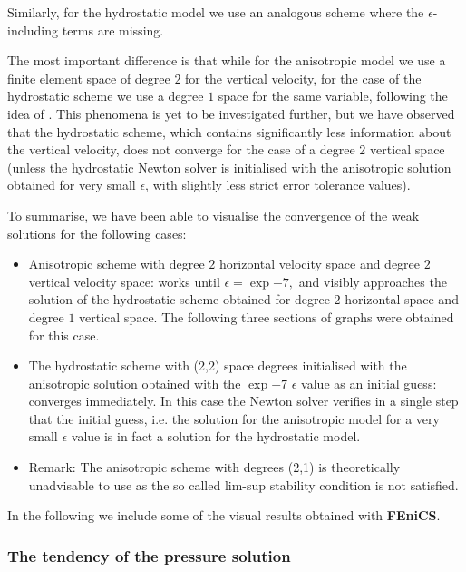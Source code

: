 \documentclass[11pt]{article}
\begin{document}
Similarly, for the hydrostatic model we use an analogous scheme where the $\epsilon$- including terms are missing.

The most important difference is that while for the anisotropic model we use a finite element space of degree $2$ for the vertical velocity, for the case of the hydrostatic scheme we use a degree $1$ space for the same variable, following the idea of \cite{danilov2004finite}. This phenomena is yet to be investigated further, but we have observed that the hydrostatic scheme, which contains significantly less information about the vertical velocity, does not converge for the case of a degree $2$ vertical space (unless the hydrostatic Newton solver is initialised with the anisotropic solution obtained for very small $\epsilon$, with slightly less strict error tolerance values).

To summarise, we have been able to visualise the convergence of the weak solutions for the following cases:

\begin{itemize}
  \item Anisotropic scheme with degree $2$ horizontal velocity space and degree $2$ vertical velocity space: works until $\epsilon = \exp{-7},$ and visibly approaches the solution of the hydrostatic scheme obtained for degree $2$ horizontal space and degree $1$ vertical space. The following three sections of graphs were obtained for this case.
  \item The hydrostatic scheme with (2,2) space degrees initialised with the anisotropic solution obtained with the $\exp{-7} $ $\epsilon$ value as an initial guess: converges immediately. In this case the Newton solver verifies in a single step that the initial guess, i.e. the solution for the anisotropic model for a very small $\epsilon$ value is in fact a solution for the hydrostatic model.
  \item Remark: The anisotropic scheme with degrees (2,1) is theoretically unadvisable to use as the so called lim-sup stability condition is not satisfied.
\end{itemize}

In the following we include some of the visual results obtained with \textbf{FEniCS}.

\newpage

\subsubsection{The tendency of the pressure solution}
\end{document}

